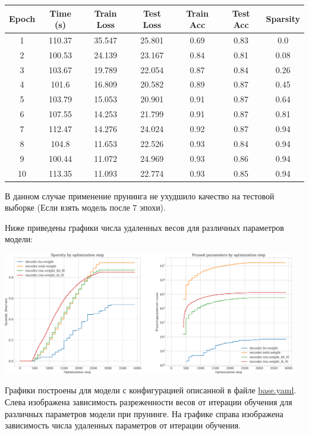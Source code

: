 \documentclass[12pt]{article}
\begin{document}
\begin{center}
\begin{tabular}{ccccccc}
  \hline
  Epoch & Time (s) & Train Loss & Test Loss & Train Acc & Test Acc & Sparsity\\
  \hline
  1 & 110.37 & 35.547 & 25.801 & 0.69 & 0.83 & 0.0\\
  2 & 100.53 & 24.139 & 23.167 & 0.84 & 0.81 & 0.08\\
  3 & 103.67 & 19.789 & 22.054 & 0.87 & 0.84 & 0.26\\
  4 & 101.6 & 16.809 & 20.582 & 0.89 & 0.87 & 0.45\\
  5 & 103.79 & 15.053 & 20.901 & 0.91 & 0.87 & 0.64\\
  6 & 107.55 & 14.253 & 21.799 & 0.91 & 0.87 & 0.81\\
  7 & 112.47 & 14.276 & 24.024 & 0.92 & 0.87 & 0.94\\
  8 & 104.8 & 11.653 & 22.526 & 0.93 & 0.84 & 0.94\\
  9 & 100.44 & 11.072 & 24.969 & 0.93 & 0.86 & 0.94\\
  10 & 113.35 & 11.093 & 22.774 & 0.93 & 0.85 & 0.94\\
  \hline
\end{tabular}
\end{center}

В данном случае применение прунинга не ухудшило качество на тестовой выборке (Если взять модель после $7$ эпохи).

Ниже приведены графики числа удаленных весов для различных параметров модели:

\begin{center}
  \includegraphics[width=0.96\textwidth]{results}
\end{center}

Графики построены для модели с конфигурацией описанной в файле \href{https://github.com/puhsu/pruning/blob/master/configs/base.yaml}{base.yaml}. Слева изображена зависимость разреженности весов от итерации обучения для различных параметров модели при прунинге.
На графике справа изображена зависимость числа удаленных параметров от итерации обучения.
\end{document}
